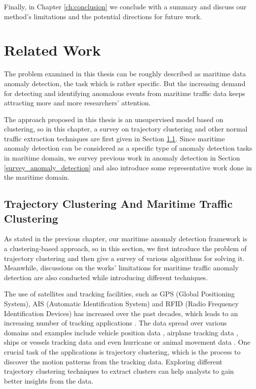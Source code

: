\documentclass[12pt,glossary]{dalcsthesis}
\begin{document}
Finally, in Chapter \ref{ch:conclusion} we conclude with a summary and discuss our method's limitations and the potential directions for future work.

\chapter{Related Work}
\label{ch:background}
The problem examined in this thesis can be roughly described as maritime data anomaly detection, the task which is rather specific. But the increasing demand for detecting and identifying anomalous events from maritime traffic data keeps attracting more and more researchers' attention. 

The approach proposed in this thesis is an unsupervised model based on clustering, so in this chapter, a survey on trajectory clustering and other normal traffic extraction techniques are first given in Section \ref{survey_normal_traffic_extraction}. Since maritime anomaly detection can be considered as a specific type of anomaly detection tasks in maritime domain,  we  survey previous work in anomaly detection in Section \ref{survey_anomaly_detection} and also introduce some representative work done in the maritime domain.


\section{Trajectory Clustering And Maritime Traffic Clustering}
\label{survey_normal_traffic_extraction}

As stated in the previous chapter, our maritime anomaly detection framework is a clustering-based approach, so in this section, we first introduce the problem of trajectory clustering and then give a survey of various algorithms for solving it. Meanwhile, discussions on the works' limitations for maritime traffic anomaly detection are also conducted while introducing different techniques.

The use of satellites and tracking facilities, such as GPS (Global Positioning System), AIS (Automatic Identification System) and RFID (Radio Frequency Identification Devices) has increased over the past decades, which leads to an increasing number of tracking applications \cite{airspaceMonitoring}. The data spread over various domains and examples include vehicle position data \cite{vehicle_clustering}, airplane tracking data \cite{airspaceMonitoring}, ships or vessels tracking data \cite{CBSMoT}\cite{PallottaFramework}\cite{vespe12}\cite{pallotta13}\cite{DDBscan} and even hurricane or animal movement data \cite{Lee07}\cite{vfkm}.  One crucial task of the applications is trajectory clustering, which is the process to discover the motion patterns from the tracking data.  Exploring different trajectory clustering techniques to extract clusters can help analysts to gain better insights from the data. 
\end{document}
